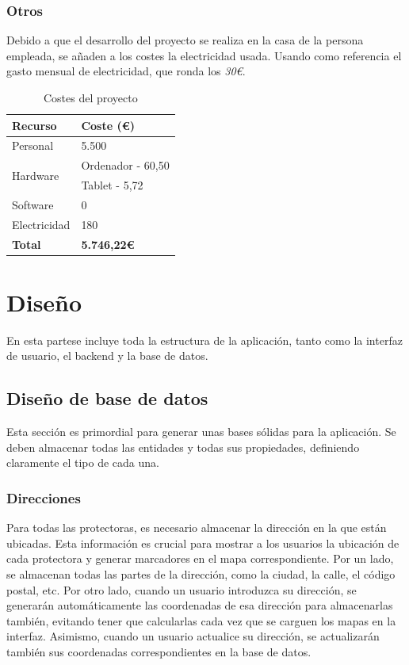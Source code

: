 \documentclass[a4paper, 12pt]{article}
\begin{document}
\subsubsection{Otros}

Debido a que el desarrollo del proyecto se realiza en la casa de la persona empleada, se añaden a los costes la electricidad usada. Usando como referencia el gasto mensual de electricidad, que ronda los \textit{30€}.

\begin{table}[H]
    \centering
    \begin{tabular}{ | m{5cm} | m{5cm} | }
	    \hline \textbf{Recurso} & \textbf{Coste (€)} \\ \hline
	    	Personal & 5.500 \\ \hline
	    	\multirow{2}{*}{Hardware} & Ordenador - 60,50 \\& Tablet - 5,72 \\ \hline
	    	Software & 0 \\ \hline
		Electricidad & 180 \\ \hline
	    \textbf{Total} & \textbf{5.746,22€} \\ \hline
    \end{tabular}
    \caption{Costes del proyecto}
    \label{tab:costes}
\end{table}

\newpage
\section{Diseño}

En esta partese incluye toda la estructura de la aplicación, tanto como la interfaz de usuario, el backend y la base de datos.

\subsection{Diseño de base de datos}

Esta sección es primordial para generar unas bases sólidas para la aplicación. Se deben almacenar todas las entidades y todas sus propiedades, definiendo claramente el tipo de cada una.

\subsubsection{Direcciones}

Para todas las protectoras, es necesario almacenar la dirección en la que están ubicadas. Esta información es crucial para mostrar a los usuarios la ubicación de cada protectora y generar marcadores en el mapa correspondiente. Por un lado, se almacenan todas las partes de la dirección, como la ciudad, la calle, el código postal, etc. Por otro lado, cuando un usuario introduzca su dirección, se generarán automáticamente las coordenadas de esa dirección para almacenarlas también, evitando tener que calcularlas cada vez que se carguen los mapas en la interfaz. Asimismo, cuando un usuario actualice su dirección, se actualizarán también sus coordenadas correspondientes en la base de datos.
\end{document}
